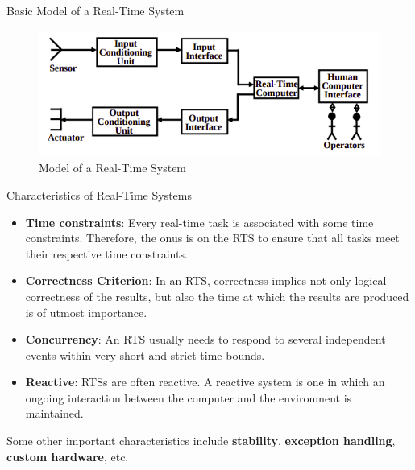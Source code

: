 \documentclass{beamer}
\begin{document}
\begin{frame}{Basic Model of a Real-Time System}
\begin{figure}[h]
    \centering
    \includegraphics[width=\textwidth]{images/model-rts.png}
    \caption{Model of a Real-Time System}
\end{figure}
\end{frame}

\begin{frame}{Characteristics of Real-Time Systems}
    \begin{itemize}
        \item \textbf{Time constraints}: Every real-time task is associated with some time constraints. Therefore, the onus is on the RTS to ensure that all tasks meet their respective time constraints. 
        \item \textbf{Correctness Criterion}: In an RTS, correctness implies not only logical correctness of the results, but also the time at which the results are produced is of utmost importance.
        \item \textbf{Concurrency}: An RTS usually needs to respond to several independent events within very short and strict time bounds. 
        \item \textbf{Reactive}: RTSs are often reactive. A reactive system is one in which an ongoing interaction between the computer and the environment is maintained.
    \end{itemize}
Some other important characteristics include \textbf{stability}, \textbf{exception handling}, \textbf{custom hardware}, etc. 
\end{frame}
\end{document}

